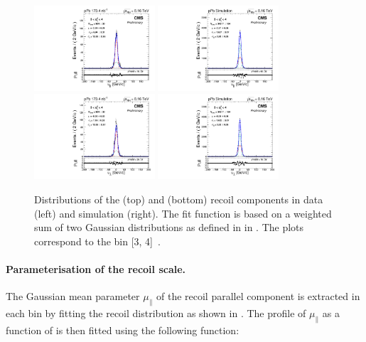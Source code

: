 \begin{figure}[htb!]
 \centering
 \includegraphics[width=0.4\textwidth]{Figures/WBoson/Analysis/Correction/Recoil/RecoilFits/Data/pfu1fit_2.pdf}
 \includegraphics[width=0.4\textwidth]{Figures/WBoson/Analysis/Correction/Recoil/RecoilFits/MC/pfu1fit_2.pdf} \\
 \includegraphics[width=0.4\textwidth]{Figures/WBoson/Analysis/Correction/Recoil/RecoilFits/Data/pfu2fit_2.pdf}
 \includegraphics[width=0.4\textwidth]{Figures/WBoson/Analysis/Correction/Recoil/RecoilFits/MC/pfu2fit_2.pdf}
 \caption{Distributions of the \utpar (top) and \utper (bottom) recoil components in data (left) and simulation (right). The fit function is based on a weighted sum of two Gaussian distributions as defined in  in . The plots correspond to the \qtZ bin [3, 4]~\GeVc.}
 \label{fig:RecoilFits}
\end{figure}

\paragraph{Parameterisation of the recoil scale.} The Gaussian mean parameter $\mu_{\parallel}$ of the recoil parallel component is extracted in each \qtZ bin by fitting the recoil \utper distribution as shown in . The profile of $\mu_{\parallel}$ as a function of \qtZ is then fitted using the following function: 

